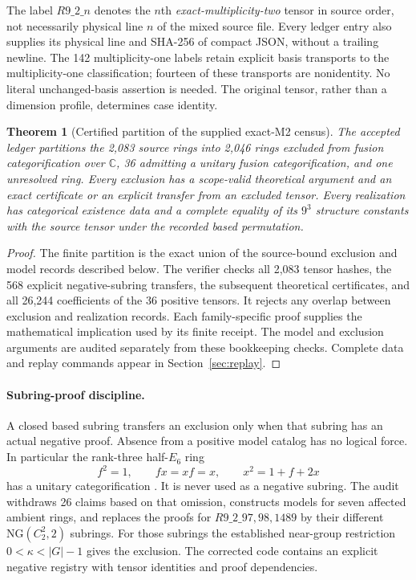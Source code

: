 \documentclass[11pt,a4paper]{article}
\newtheorem{theorem}{Theorem}[section]\newtheorem{proposition}[theorem]{Proposition}
\theoremstyle{remark}\newtheorem{remark}[theorem]{Remark}
\newcommand{\C}{\mathbb C}\newcommand{\Q}{\mathbb Q}\newcommand{\Z}{\mathbb Z}
\begin{document}
The label $R9\_2\_n$ denotes the $n$th \emph{exact-multiplicity-two} tensor
in source order, not necessarily physical line $n$ of the mixed source file.
Every ledger entry also supplies its physical line and SHA-256 of compact
JSON, without a trailing newline. The 142 multiplicity-one labels retain
explicit basis transports to the multiplicity-one classification; fourteen
of these transports are nonidentity. No literal unchanged-basis assertion is
needed. The original tensor, rather than a dimension profile, determines
case identity.

\begin{theorem}[Certified partition of the supplied exact-M2 census]
The accepted ledger partitions the 2,083 source rings into 2,046 rings
excluded from fusion categorification over $\C$, 36 admitting a unitary
fusion categorification, and one unresolved ring. Every exclusion has a
scope-valid theoretical argument and an exact certificate or an explicit
transfer from an excluded tensor. Every realization has categorical
existence data and a complete equality of its $9^3$ structure constants
with the source tensor under the recorded based permutation.
\end{theorem}
\begin{proof}
The finite partition is the exact union of the source-bound exclusion and
model records described below. The verifier checks all 2,083 tensor hashes,
the 568 explicit negative-subring transfers, the subsequent theoretical
certificates, and all 26,244 coefficients of the 36 positive tensors. It rejects any overlap between exclusion and
realization records. Each family-specific proof supplies the mathematical
implication used by its finite receipt. The model and exclusion arguments
are audited separately from these bookkeeping checks. Complete data and
replay commands appear in Section~\ref{sec:replay}.
\end{proof}

\paragraph{Subring-proof discipline.}
A closed based subring transfers an exclusion only when that subring has
an actual negative proof. Absence from a positive model catalog has no
logical force. In particular the rank-three half-$E_6$ ring
\[
 f^2=1,\qquad fx=xf=x,\qquad x^2=1+f+2x
\]
has a unitary categorification \cite{HH,ALW}. It is never used as a negative
subring. The audit withdraws 26 claims based on that omission, constructs
models for seven affected ambient rings, and replaces the proofs for
$R9\_2\_97,98,1489$ by their different $\mathrm{NG}(C_2^2,2)$ subrings.
For those subrings the established near-group restriction
$0<\kappa<|G|-1$ gives the exclusion. The corrected code contains an
explicit negative registry with tensor identities and proof dependencies.
\end{document}
